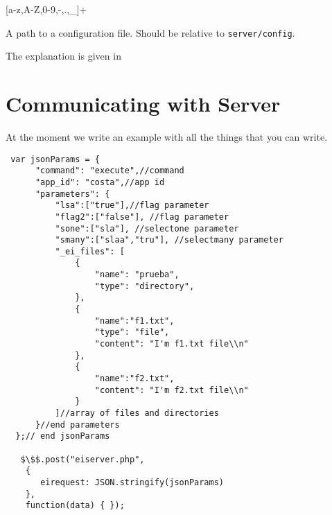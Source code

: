 [a-z,A-Z,0-9,-,.,\_]+

\bigskip
\noindent
{}

A path to a configuration file. Should be relative to
\texttt{server/config}.

\bigskip
\noindent
{}

The explanation is given in 

\section{Communicating with \ei Server}
\label{ch:server:protocol}

At the moment we write an example with
 all the things that you can write.

\begin{lstlisting}
 var jsonParams = {
      "command": "execute",//command
      "app_id": "costa",//app id
      "parameters": {
          "lsa":["true"],//flag parameter
          "flag2":["false"], //flag parameter
          "sone":["sla"], //selectone parameter
          "smany":["slaa","tru"], //selectmany parameter
          "_ei_files": [
              {
                  "name": "prueba",
                  "type": "directory",
              },
              {
                  "name":"f1.txt",
                  "type": "file",
                  "content": "I'm f1.txt file\\n"
              },
              {
                  "name":"f2.txt",
                  "content": "I'm f2.txt file\\n"
              }
          ]//array of files and directories
      }//end parameters
  };// end jsonParams

   $\$$.post("eiserver.php",
    {
       eirequest: JSON.stringify(jsonParams)
    },
    function(data) { });
\end{lstlisting}
